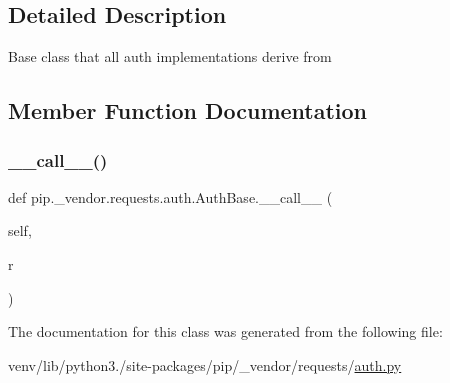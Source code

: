 \subsection{Detailed Description}
\begin{DoxyVerb}Base class that all auth implementations derive from\end{DoxyVerb}
 

\subsection{Member Function Documentation}
\mbox{\label{classpip_1_1__vendor_1_1requests_1_1auth_1_1AuthBase_ac1d7aed0047833e39afd6e78fbb9ae73}} 
\subsubsection{\texorpdfstring{\+\_\+\+\_\+call\+\_\+\+\_\+()}{\_\_call\_\_()}}
{\footnotesize\ttfamily def pip.\+\_\+vendor.\+requests.\+auth.\+Auth\+Base.\+\_\+\+\_\+call\+\_\+\+\_\+ (\begin{DoxyParamCaption}\item[{}]{self,  }\item[{}]{r }\end{DoxyParamCaption})}



The documentation for this class was generated from the following file\+:\begin{DoxyCompactItemize}
\item 
venv/lib/python3./site-\/packages/pip/\+\_\+vendor/requests/\hyperlink{__vendor_2requests_2auth_8py}{auth.\+py}\end{DoxyCompactItemize}
